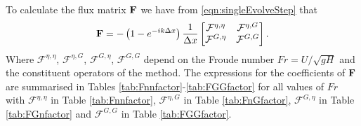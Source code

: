To calculate the flux matrix $\mathbf{F}$ we have from \eqref{eqn:singleEvolveStep} that
\begin{equation*}
 \mathbf{F} = - \left(1 - e^{-ik\Delta x}\right)\dfrac{1}{ \Delta x}\begin{bmatrix}
 \mathcal{F}^{\eta,\eta} & \mathcal{F}^{\eta,G} \\\mathcal{F}^{G,\eta} &\mathcal{F}^{G,G}
 \end{bmatrix}.
\end{equation*}
Where $\mathcal{F}^{\eta,\eta} $, $\mathcal{F}^{\eta,G}$, $\mathcal{F}^{G,\eta} $, $\mathcal{F}^{G,G} $ depend on the Froude number $Fr = {U}/{\sqrt{gH}}$ and the constituent operators of the method. The expressions for the coefficients of $\mathbf{F}$ are summarised in Tables \ref{tab:Fnnfactor}-\ref{tab:FGGfactor} for all values of $Fr$ with $\mathcal{F}^{\eta,\eta}$ in Table \ref{tab:Fnnfactor}, $\mathcal{F}^{\eta,G}$ in Table \ref{tab:FnGfactor}, $\mathcal{F}^{G,\eta}$ in Table \ref{tab:FGnfactor} and $\mathcal{F}^{G,G}$ in Table \ref{tab:FGGfactor}.


